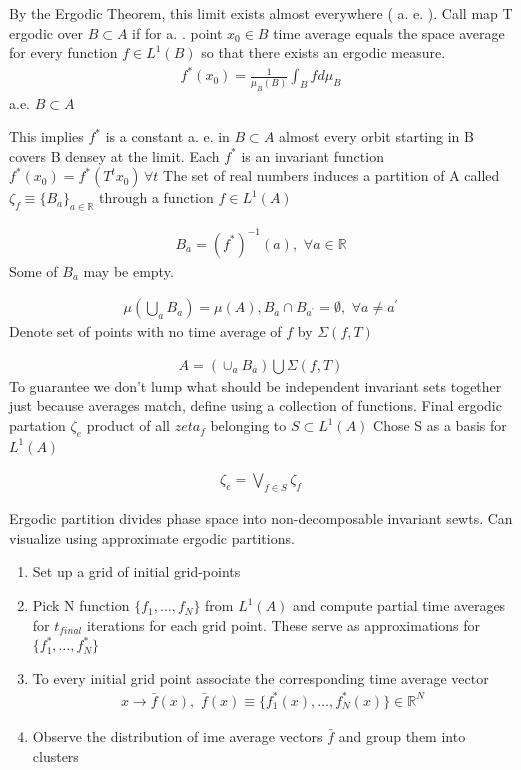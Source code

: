 \documentclass[12pt]{article}
\begin{document}
By the Ergodic Theorem, this limit exists almost everywhere ( a. e. ).
Call map T ergodic over $B \subset A$ if for a. . point  $x_0 \in B$ time average equals the space average for every function $f \in L^1(B)$ so that there exists an
ergodic measure.
\begin{gather*}
f^\ast(x_0) =\frac{1}{\mu_B(B)}\int_B f d\mu_B  
\end{gather*}
a.e. $B \subset A$

This implies $f^\ast$ is a constant a. e. in $B \subset A$  almost every orbit starting in B covers B densey at the limit.  Each $f^\ast$ is an invariant function $f^\ast(x_0)= f^\ast(T^tx_0) \, \forall t$  
The set of real numbers induces a partition of A called $\zeta_f\equiv \{B_a\}_{a\in\mathbb{R}}$ through a function $f\in L^1(A)$

\begin{gather*}
  B_a=(f^\ast)^{-1}(a), \,\,\forall a \in \mathbb{R}
\end{gather*}
Some of $B_a$ may be empty.

\begin{gather*}
  \mu\left (\bigcup_aB_a \right )=\mu(A),B_a\cap B_{a^\prime} = \emptyset ,\,\,\forall a \ne a^\prime
\end{gather*}
Denote set of points with no time average of $f$ by $\Sigma(f,T)$

\begin{gather*}
  A=(\cup_aB_a)\bigcup \Sigma(f,T)
\end{gather*}
To guarantee we don't lump what should be independent invariant sets together just because averages match, define using a collection of functions.
Final ergodic partation $\zeta_e$ product of all $zeta_f$ belonging to $S \subset L^1(A)$  Chose S as a basis for $L^1(A)$

\begin{gather*}
  \zeta_e= \bigvee_{f\in S} \zeta_f
\end{gather*}

Ergodic partition divides phase space into non-decomposable invariant sewts.  Can visualize using approximate ergodic partitions.

\begin{enumerate}
\item Set up a grid of initial grid-points
\item Pick N function $\{f_1,\ldots,f_N\}$ from $L^1(A)$ and compute partial time averages for $t_{final}$ iterations for each grid point.  These serve as approximations for $\{f_1^\ast,\ldots,f_N^\ast\}$
\item To every initial grid point associate the corresponding time average vector
  \begin{gather*}
    x \rightarrow \bar{f}(x),\,\, \bar{f}(x)\equiv \{f_1^\ast(x),\ldots,f_N^\ast(x)\}\in \mathbb{R}^N
  \end{gather*}
\item Observe the distribution of ime average vectors $\bar{f}$ and group them into clusters
\end{enumerate}
\end{document}
